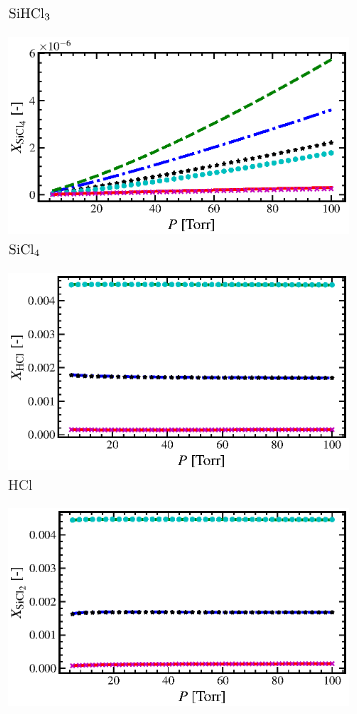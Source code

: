 \documentclass[final, letterpaper, square, comma, numbers, sort&compress]{elsarticle}
\begin{document}
\begin{figure}
\begin{subfigure}{0.49\textwidth}
        \caption{$\rm SiHCl_3$}
    \end{subfigure}
    \begin{subfigure}{0.49\textwidth}
        \centering
        \includegraphics[width=0.99\textwidth]{P-vs-SiCl4-compare}
        \caption{$\rm SiCl_4$}
    \end{subfigure}
    \begin{subfigure}{0.49\textwidth}
        \centering
        \includegraphics[width=0.99\textwidth]{P-vs-HCl-compare}
        \caption{HCl}
    \end{subfigure}
    \begin{subfigure}{0.49\textwidth}
        \centering
        \includegraphics[width=0.99\textwidth]{P-vs-SiCl2-compare}

\end{subfigure}
\end{figure}
\end{document}
